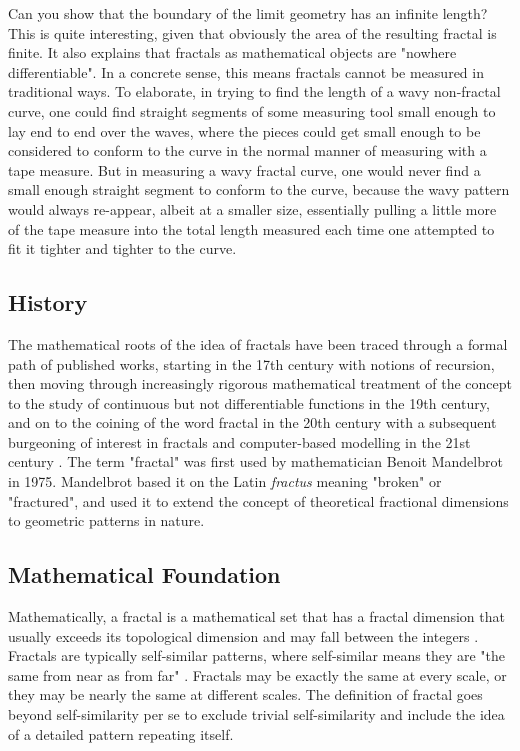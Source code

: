 \documentclass{article}
\begin{document}
\noindent
Can you show that the boundary of the limit geometry has an infinite length?\\


\noindent
This is quite interesting, given that obviously the area of the resulting fractal is finite.
It also explains that fractals 
as mathematical objects are "nowhere differentiable". In a concrete sense, this means 
fractals cannot be measured in traditional ways. To elaborate, in trying to find the length 
of a wavy non-fractal curve, one could find straight segments of some measuring tool small 
enough to lay end to end over the waves, where the pieces could get small enough to be considered 
to conform to the curve in the normal manner of measuring with a tape measure. But in measuring a 
wavy fractal curve, one would never find a small enough straight segment to conform to the curve, 
because the wavy pattern would always re-appear, albeit at a smaller size, essentially pulling 
a little more of the tape measure into the total length measured each time one attempted to 
fit it tighter and tighter to the curve. 

\subsection{History}

The mathematical roots of the idea of fractals have been traced through a formal path of published 
works, starting in the 17th century with notions of recursion, then moving through increasingly 
rigorous mathematical treatment of the concept to the study of continuous but not differentiable 
functions in the 19th century, and on to the coining of the word fractal in the 20th century 
with a subsequent burgeoning of interest in fractals and computer-based modelling in the 21st 
century \cite{f4,f5}. The term "fractal" was first used by mathematician Benoit Mandelbrot in 
1975. Mandelbrot based it on the Latin {\em fractus} meaning "broken" or "fractured", and used 
it to extend the concept of theoretical fractional dimensions to geometric patterns in nature.

\subsection{Mathematical Foundation}

Mathematically, a fractal is a mathematical set that has a fractal dimension that usually exceeds its topological 
dimension \cite{f1} and may fall between the integers \cite{f2}. Fractals are typically self-similar 
patterns, where self-similar means they are "the same from near as from far" \cite{f3}. Fractals may 
be exactly the same at every scale, or they may be nearly the same at different scales. The 
definition of fractal goes beyond self-similarity per se to exclude trivial self-similarity and 
include the idea of a detailed pattern repeating itself. 
\end{document}
